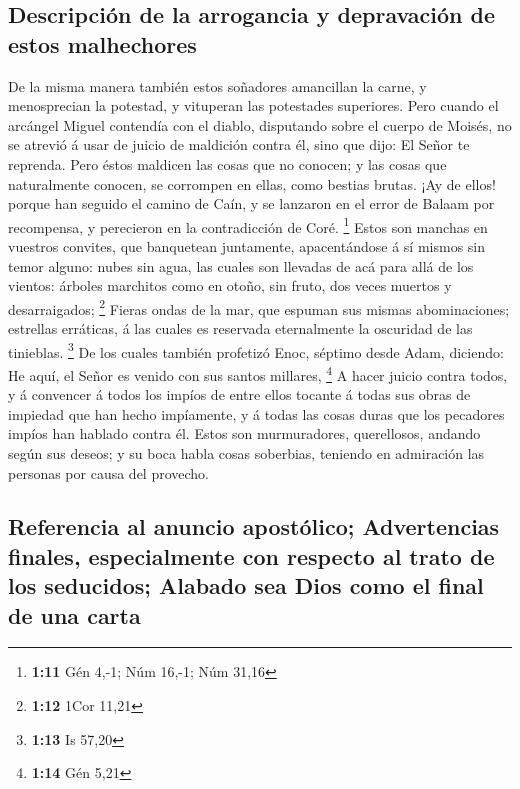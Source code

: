 \hypertarget{descripciuxf3n-de-la-arrogancia-y-depravaciuxf3n-de-estos-malhechores}{%
\subsection{Descripción de la arrogancia y depravación de estos
malhechores}\label{descripciuxf3n-de-la-arrogancia-y-depravaciuxf3n-de-estos-malhechores}}

 De la misma manera también estos soñadores amancillan la
carne, y menosprecian la potestad, y vituperan las potestades
superiores.  Pero cuando el arcángel Miguel contendía con
el diablo, disputando sobre el cuerpo de Moisés, no se atrevió á usar de
juicio de maldición contra él, sino que dijo: El Señor te reprenda.
 Pero éstos maldicen las cosas que no conocen; y las
cosas que naturalmente conocen, se corrompen en ellas, como bestias
brutas.  ¡Ay de ellos! porque han seguido el camino de
Caín, y se lanzaron en el error de Balaam por recompensa, y perecieron
en la contradicción de Coré. \footnote{\textbf{1:11} Gén 4,-1; Núm
  16,-1; Núm 31,16}  Estos son manchas en vuestros
convites, que banquetean juntamente, apacentándose á sí mismos sin temor
alguno: nubes sin agua, las cuales son llevadas de acá para allá de los
vientos: árboles marchitos como en otoño, sin fruto, dos veces muertos y
desarraigados; \footnote{\textbf{1:12} 1Cor 11,21} 
Fieras ondas de la mar, que espuman sus mismas abominaciones; estrellas
erráticas, á las cuales es reservada eternalmente la oscuridad de las
tinieblas. \footnote{\textbf{1:13} Is 57,20}  De los
cuales también profetizó Enoc, séptimo desde Adam, diciendo: He aquí, el
Señor es venido con sus santos millares, \footnote{\textbf{1:14} Gén
  5,21}  A hacer juicio contra todos, y á convencer á
todos los impíos de entre ellos tocante á todas sus obras de impiedad
que han hecho impíamente, y á todas las cosas duras que los pecadores
impíos han hablado contra él.  Estos son murmuradores,
querellosos, andando según sus deseos; y su boca habla cosas soberbias,
teniendo en admiración las personas por causa del provecho.

\hypertarget{referencia-al-anuncio-apostuxf3lico-advertencias-finales-especialmente-con-respecto-al-trato-de-los-seducidos-alabado-sea-dios-como-el-final-de-una-carta}{%
\subsection{Referencia al anuncio apostólico; Advertencias finales,
especialmente con respecto al trato de los seducidos; Alabado sea Dios
como el final de una
carta}\label{referencia-al-anuncio-apostuxf3lico-advertencias-finales-especialmente-con-respecto-al-trato-de-los-seducidos-alabado-sea-dios-como-el-final-de-una-carta}}

